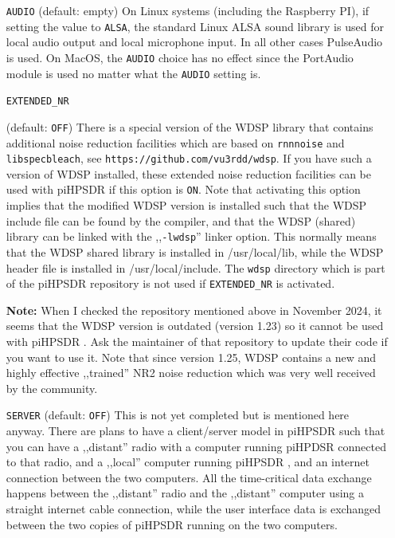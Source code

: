 \documentclass[12pt]{book}
\def\rett#1{\texttt{\color{red}#1}}
\def\pH{pi\-HPSDR }
\begin{document}
\begin{itemize}
\item[\rett{AUDIO}] {(default: empty)
On Linux systems (including the Raspberry PI), if setting the value to \texttt{ALSA},
the standard Linux ALSA sound library is used for local audio
output and local microphone input. In all other cases
PulseAudio is used. On MacOS, the \texttt{AUDIO} choice has no effect since the PortAudio
module is used no matter what the \texttt{AUDIO} setting is.
}

\item[\rett{EXTENDED\_NR}] {(default: \texttt{OFF})
There is a special version of the WDSP library that contains additional noise
reduction facilities which are based on  \texttt{rnnnoise} and \texttt{libspecbleach}, see
 \texttt{https://github.com/vu3rdd/wdsp}. If you have such a version of WDSP installed, these
 extended noise reduction facilities can be used with \pH if this option is \texttt{ON}.
 Note that activating this option implies that the modified WDSP version is installed such
 that the WDSP include file can be found by the compiler, and that the WDSP (shared)
 library can be linked with the ,,\texttt{-lwdsp}'' linker option. This normally means
 that the WDSP shared library is installed in /usr/local/lib, while the WDSP header file
 is installed in /usr/local/include. The \texttt{wdsp} directory which is part of
 the \pH repository is not used if \texttt{EXTENDED\_NR} is activated.

{\bf Note:} When I  checked the repository mentioned above in November 2024, it seems that the
WDSP version is outdated (version 1.23) so it cannot be used with \pH. Ask the maintainer
of that repository to update their code if you want to use it. Note that since version 1.25, WDSP
contains a new and highly effective ,,trained'' NR2 noise reduction which was very well
received by the community.
}

\item[\rett{SERVER}] {(default: \texttt{OFF})
 This is not yet completed but is mentioned here anyway. There are plans to have
 a client/server model in \pH such that you can have a ,,distant'' radio with a computer
 running piHPDSR connected to that radio, and a ,,local'' computer running \pH, and an
 internet connection between the two computers. All the time-critical data exchange happens
 between the ,,distant'' radio and the ,,distant'' computer using a straight internet
 cable connection, while the user interface data is exchanged between the two copies of
 \pH running on the two computers.
}

\end{itemize}
\end{document}
